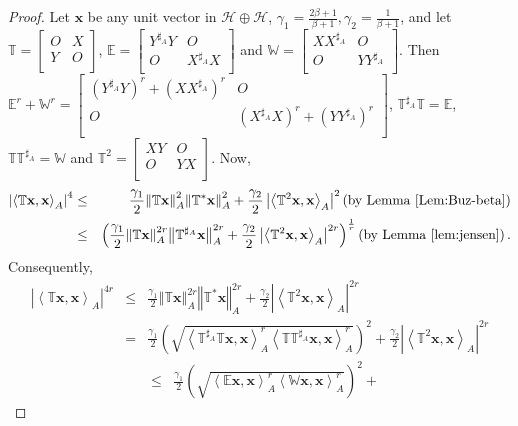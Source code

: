 \documentclass{article}
\newcommand{\bra}[1]{\left(#1\right)}
\newcommand{\seqA}[1]{{\left<#1\right>}_{A}}
\newcommand{\normA}[1]{{\left\Vert#1\right\Vert}_{A}}
\newcommand{\abs}[1]{\left\vert#1\right\vert}
\newcommand {\W}{\mathbb{W}}
\newcommand {\E}{\mathbb{E}}
\newcommand {\T}{\mathbb{T}}
\newcommand {\h}{\mathcal{H}}
\newcommand {\Ta}{\mathbb{T}^{\sharp_{A}}}
\newcommand {\Xa}{X^{\sharp_{A}}}
\newcommand {\Ya}{Y^{\sharp_{A}}}
\begin{document}
\begin{proof} Let $\mathbf{x}$ be any unit vector in $\h \oplus\h$, $\gamma_1=\frac{2\beta+1}{\beta+1}, \gamma_2=\frac{1}{\beta+1}$, and let $\T=\begin{bmatrix} O& X\\ Y& O \\\end{bmatrix}$, $\E=\begin{bmatrix} \Ya Y& O\\ O& \Xa X \\\end{bmatrix}$ and $\W=\begin{bmatrix} X\Xa & O\\ O& Y\Ya \\\end{bmatrix}$.  Then $\E^r+\W^r=\begin{bmatrix} \bra{\Ya Y}^r+\bra{X\Xa}^r& O\\ O& \bra{\Xa X}^r+\bra{Y\Ya}^r \\\end{bmatrix}$, $\Ta \T=\E$, $\T\Ta=\W$
and $\T^2=\begin{bmatrix} XY& O\\ O& YX \\\end{bmatrix}$. Now,
\begin{eqnarray*}
  \abs{\seqA{\T\mathbf{x},\mathbf{x}}}^{4} &\leq& \frac{\gamma_1}{2}\normA{\T\mathbf{x}}^2\normA{\T^*\mathbf{x}}^2+
  \frac{\gamma_2}{2}\abs{\seqA{\T^2\mathbf{x},\mathbf{x}}}^{2}\bra{\mbox{by Lemma \ref{Lem:Buz-beta}}} \\
   &\leq&\bra{\frac{\gamma_1}{2}\normA{\T\mathbf{x}}^{2r}\normA{\Ta\mathbf{x}}^{2r}+
   \frac{\gamma_2}{2}\abs{\seqA{\T^2\mathbf{x},\mathbf{x}}}^{2r}}^{\frac{1}{r}}\bra{\mbox{by Lemma \ref{lem:jensen}}}.
   \end{eqnarray*}
Consequently,
\begin{eqnarray*}
   \abs{\seqA{\T\mathbf{x},\mathbf{x}}}^{4r} &\leq& \frac{\gamma_1}{2}\normA{\T\mathbf{x}}^{2r}\normA{\T^*\mathbf{x}}^{2r}+
   \frac{\gamma_2}{2}\abs{\seqA{\T^2\mathbf{x},\mathbf{x}}}^{2r}\\
  &=& \frac{\gamma_1}{2}\bra{\sqrt{\seqA{\Ta\T\mathbf{x},\mathbf{x}}^{r}\seqA{\T\Ta\mathbf{x},\mathbf{x}}^{r}}}^2+
  \frac{\gamma_2}{2}\abs{\seqA{\T^2\mathbf{x},\mathbf{x}}}^{2r}
  \end{eqnarray*}
   \begin{eqnarray*}
  &\leq& \frac{\gamma_1}{2}\bra{\sqrt{\seqA{\E\mathbf{x},\mathbf{x}}^{r}\seqA{\W\mathbf{x},\mathbf{x}}^{r}}}^2+

\end{eqnarray*}
\end{proof}
\end{document}
